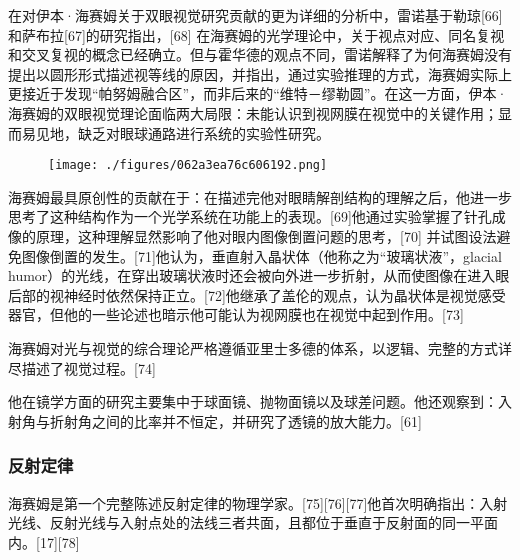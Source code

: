 在对伊本·海赛姆关于双眼视觉研究贡献的更为详细的分析中，雷诺基于勒琼[66]和萨布拉[67]的研究指出，[68] 在海赛姆的光学理论中，关于视点对应、同名复视和交叉复视的概念已经确立。但与霍华德的观点不同，雷诺解释了为何海赛姆没有提出以圆形形式描述视等线的原因，并指出，通过实验推理的方式，海赛姆实际上更接近于发现“帕努姆融合区”，而非后来的“维特－缪勒圆”。在这一方面，伊本·海赛姆的双眼视觉理论面临两大局限：未能认识到视网膜在视觉中的关键作用；显而易见地，缺乏对眼球通路进行系统的实验性研究。
\begin{figure}[ht]
\centering
\texttt{[image: ./figures/062a3ea76c606192.png]}
\caption{} \label{fig_YBH_2}
\end{figure}
海赛姆最具原创性的贡献在于：在描述完他对眼睛解剖结构的理解之后，他进一步思考了这种结构作为一个光学系统在功能上的表现。[69]他通过实验掌握了针孔成像的原理，这种理解显然影响了他对眼内图像倒置问题的思考，[70] 并试图设法避免图像倒置的发生。[71]他认为，垂直射入晶状体（他称之为“玻璃状液”，glacial humor）的光线，在穿出玻璃状液时还会被向外进一步折射，从而使图像在进入眼后部的视神经时依然保持正立。[72]他继承了盖伦的观点，认为晶状体是视觉感受器官，但他的一些论述也暗示他可能认为视网膜也在视觉中起到作用。[73]

海赛姆对光与视觉的综合理论严格遵循亚里士多德的体系，以逻辑、完整的方式详尽描述了视觉过程。[74]

他在镜学方面的研究主要集中于球面镜、抛物面镜以及球差问题。他还观察到：入射角与折射角之间的比率并不恒定，并研究了透镜的放大能力。[61]
\subsubsection{反射定律}
海赛姆是第一个完整陈述反射定律的物理学家。[75][76][77]他首次明确指出：入射光线、反射光线与入射点处的法线三者共面，且都位于垂直于反射面的同一平面内。[17][78]
